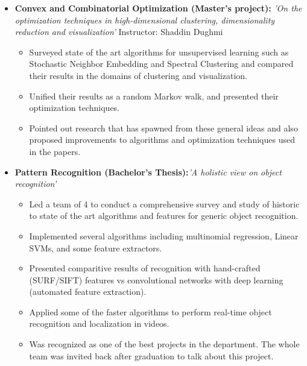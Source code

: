 \documentclass[10pt,letterpaper,sans]{moderncv}        %
\begin{document}
\begin{itemize}

\item{\textbf{Convex and Combinatorial Optimization (Master's project):} \textit{'On the optimization techniques in high-dimensional
clustering, dimensionality reduction and visualization'}
Instructor: Shaddin Dughmi
\vspace{1pt}

\small{
\begin{itemize}
\item Surveyed state of the art algorithms for unsupervised learning such as Stochastic Neighbor Embedding and Spectral Clustering and compared their results in the domains of clustering and visualization.
\item Unified their results as a random Markov walk, and presented their optimization techniques.
\item Pointed out research that has spawned from these general ideas and also proposed improvements to algorithms and optimization techniques used in the papers.
\end{itemize}}}

\item{\textbf{Pattern Recognition (Bachelor's Thesis):}\textit{'A holistic view on object recognition'}
\vspace{1pt}
\small{
\begin{itemize}
\item Led a team of 4 to conduct a comprehensive survey and study of historic to state of the art algorithms and features for generic object recognition.
\item Implemented several algorithms including multinomial regression, Linear SVMs, and some feature extractors.
\item Presented comparitive results of recognition with hand-crafted (SURF/SIFT) features vs convolutional networks with deep learning (automated feature extraction).
\item Applied some of the faster algorithms to perform real-time object recognition and localization in videos.
\item Was recognized as one of the best projects in the department. The whole team was invited back after graduation to talk about this project.
\end{itemize}
}
}

\end{itemize}
\end{document}
